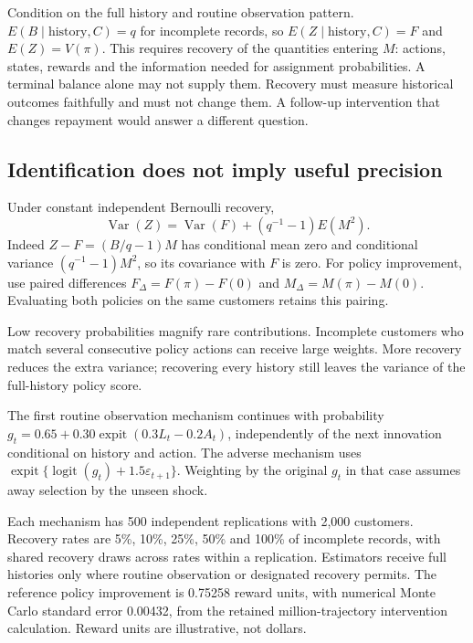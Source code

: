 Condition on the full history and routine observation pattern.
$E(B\mid\text{history},C)=q$ for incomplete records, so
$E(Z\mid\text{history},C)=F$ and $E(Z)=V(\pi)$. This requires recovery of
the quantities entering $M$: actions, states, rewards and the information
needed for assignment probabilities. A terminal balance alone may not
supply them. Recovery must measure historical outcomes faithfully and must
not change them. A follow-up intervention that changes repayment would
answer a different question.

\subsection{Identification does not imply useful precision}
Under constant independent Bernoulli recovery,
\begin{equation}
\operatorname{Var}(Z)=\operatorname{Var}(F)
                   +(q^{-1}-1)E(M^2).
\label{closure30:audit-variance}
\end{equation}
Indeed $Z-F=(B/q-1)M$ has conditional mean zero and conditional variance
$(q^{-1}-1)M^2$, so its covariance with $F$ is zero. For policy improvement,
use paired differences $F_\Delta=F(\pi)-F(0)$ and
$M_\Delta=M(\pi)-M(0)$. Evaluating both policies on the same customers
retains this pairing.

Low recovery probabilities magnify rare contributions. Incomplete customers
who match several consecutive policy actions can receive large weights.
More recovery reduces the extra variance; recovering every history still
leaves the variance of the full-history policy score.

The first routine observation mechanism continues with probability
$g_t=0.65+0.30\operatorname{expit}(0.3L_t-0.2A_t)$, independently of the
next innovation conditional on history and action. The adverse mechanism
uses $\operatorname{expit}\{\operatorname{logit}(g_t)+1.5\varepsilon_{t+1}\}$.
Weighting by the original $g_t$ in that case assumes away selection by the
unseen shock.

Each mechanism has 500 independent replications with 2,000 customers.
Recovery rates are 5\%, 10\%, 25\%, 50\% and 100\% of incomplete records,
with shared recovery draws across rates within a replication. Estimators
receive full histories only where routine observation or designated recovery
permits. The reference policy improvement is 0.75258 reward units, with
numerical Monte Carlo standard error 0.00432, from the retained
million-trajectory intervention calculation. Reward units are illustrative,
not dollars.

